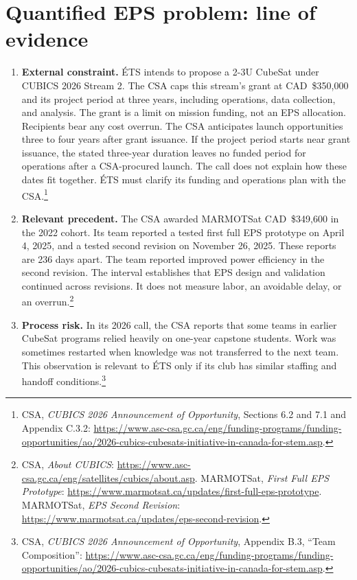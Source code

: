 \section{Quantified EPS problem: line of evidence}

\begin{enumerate}
    \item \textbf{External constraint.} ÉTS intends to propose a 2-3U CubeSat under CUBICS 2026 Stream 2. The CSA caps this stream's grant at CAD~\$350{,}000 and its project period at three years, including operations, data collection, and analysis. The grant is a limit on mission funding, not an EPS allocation. Recipients bear any cost overrun. The CSA anticipates launch opportunities three to four years after grant issuance. If the project period starts near grant issuance, the stated three-year duration leaves no funded period for operations after a CSA-procured launch. The call does not explain how these dates fit together. ÉTS must clarify its funding and operations plan with the CSA.\footnote{CSA, \emph{CUBICS 2026 Announcement of Opportunity}, Sections 6.2 and 7.1 and Appendix C.3.2: \url{https://www.asc-csa.gc.ca/eng/funding-programs/funding-opportunities/ao/2026-cubics-cubesats-initiative-in-canada-for-stem.asp}.}

    \item \textbf{Relevant precedent.} The CSA awarded MARMOTSat CAD~\$349{,}600 in the 2022 cohort. Its team reported a tested first full EPS prototype on April 4, 2025, and a tested second revision on November 26, 2025. These reports are 236 days apart. The team reported improved power efficiency in the second revision. The interval establishes that EPS design and validation continued across revisions. It does not measure labor, an avoidable delay, or an overrun.\footnote{CSA, \emph{About CUBICS}: \url{https://www.asc-csa.gc.ca/eng/satellites/cubics/about.asp}. MARMOTSat, \emph{First Full EPS Prototype}: \url{https://www.marmotsat.ca/updates/first-full-eps-prototype}. MARMOTSat, \emph{EPS Second Revision}: \url{https://www.marmotsat.ca/updates/eps-second-revision}.}

    \item \textbf{Process risk.} In its 2026 call, the CSA reports that some teams in earlier CubeSat programs relied heavily on one-year capstone students. Work was sometimes restarted when knowledge was not transferred to the next team. This observation is relevant to ÉTS only if its club has similar staffing and handoff conditions.\footnote{CSA, \emph{CUBICS 2026 Announcement of Opportunity}, Appendix B.3, ``Team Composition'': \url{https://www.asc-csa.gc.ca/eng/funding-programs/funding-opportunities/ao/2026-cubics-cubesats-initiative-in-canada-for-stem.asp}.}


\end{enumerate}
